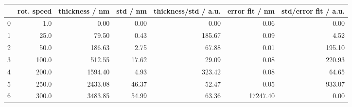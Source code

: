 \begin{tabular}{lrrrrrr}
\toprule
{} &  rot. speed &  thickness / nm &  std / nm &  thickness/std / a.u. &  error fit / nm &  std/error fit / a.u. \\
\midrule
0 &         1.0 &            0.00 &      0.00 &                  0.00 &            0.06 &                  0.00 \\
1 &        25.0 &           79.50 &      0.43 &                185.67 &            0.09 &                  4.52 \\
2 &        50.0 &          186.63 &      2.75 &                 67.88 &            0.01 &                195.10 \\
3 &       100.0 &          512.55 &     17.62 &                 29.09 &            0.08 &                220.93 \\
4 &       200.0 &         1594.40 &      4.93 &                323.42 &            0.08 &                 64.65 \\
5 &       250.0 &         2433.08 &     46.37 &                 52.47 &            0.05 &                933.07 \\
6 &       300.0 &         3483.85 &     54.99 &                 63.36 &        17247.40 &                  0.00 \\
\bottomrule
\end{tabular}
